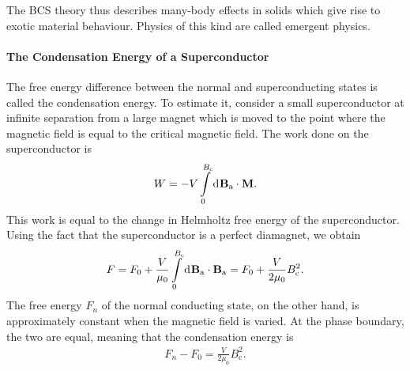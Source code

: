 The BCS theory thus describes many-body effects in solids which give rise to exotic material behaviour. Physics of this kind are called emergent physics.

\paragraph{The Condensation Energy of a Superconductor}
The free energy difference between the normal and superconducting states is called the condensation energy. To estimate it, consider a small superconductor at infinite separation from a large magnet which is moved to the point where the magnetic field is equal to the critical magnetic field. The work done on the superconductor is
\begin{align*}
	W = -V\int\limits_{0}^{B_{\text{c}}}\dd[]{\vb{B}_{\text{a}}}\cdot\vb{M}.
\end{align*}
This work is equal to the change in Helmholtz free energy of the superconductor. Using the fact that the superconductor is a perfect diamagnet, we obtain
\begin{align*}
	F = F_{0} + \frac{V}{\mu_{0}}\int\limits_{0}^{B_{\text{c}}}\dd[]{\vb{B}_{\text{a}}}\cdot\vb{B}_{\text{a}} = F_{0} + \frac{V}{2\mu_{0}}B_{\text{c}}^{2}.
\end{align*}
The free energy $F_{n}$ of the normal conducting state, on the other hand, is approximately constant when the magnetic field is varied. At the phase boundary, the two are equal, meaning that the condensation energy is
\begin{align*}
	F_{n} - F_{0} = \frac{V}{2\mu_{0}}B_{\text{c}}^{2}.
\end{align*}